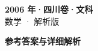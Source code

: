 \documentclass[zihao=-4, a4paper]{ctexart}
\begin{document}
\begin{center}
  {\Large\bfseries 2006 年·四川卷·文科}\\[4pt]
  {\large 数学 · 解析版}
\end{center}
\medskip
{}

\clearpage
{}
\begin{center}{\Large\bfseries 参考答案与详细解析}\end{center}
\medskip

\end{document}

